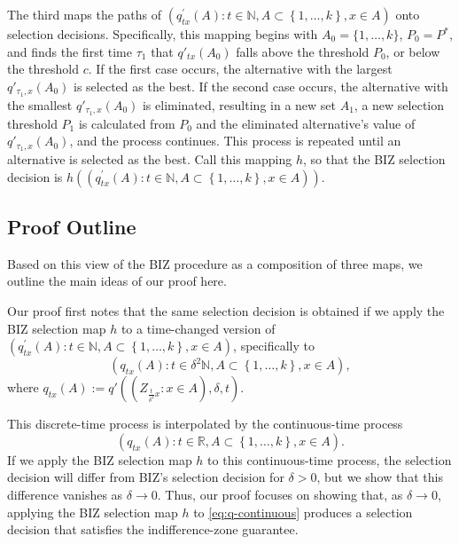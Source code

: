 \documentclass{wscpaperproc}
\theoremstyle{wsc}
\providecommand{\DIFaddtex}[1]{{\protect\color{blue}\uwave{#1}}} %
\providecommand{\DIFaddbegin}{} %
\providecommand{\DIFaddend}{} %
\providecommand{\DIFadd}[1]{\texorpdfstring{\DIFaddtex{#1}}{#1}} %
\begin{document}
The third \DIFaddbegin \DIFadd{one }\DIFaddend maps the paths of $\left(q_{tx}^{'}\left(A\right):t\in\mathbb{N},A\subset\left\{ 1,\ldots,k\right\} ,x\in A\right)$
onto selection decisions. Specifically, this mapping begins with $A_0 = \{1,\ldots,k\}$,
$P_0=P^*$, 
and finds the first time $\tau_1$ that $q'_{tx}(A_0)$ falls above the threshold $P_0$,
or below the threshold $c$.
If the first case occurs, the alternative with the largest $q'_{\tau_1,x}(A_0)$ is selected as the best.
If the second case occurs, the alternative with the smallest
$q'_{\tau_1,x}(A_0)$ is eliminated, resulting in a new set $A_1$, a new selection threshold 
$P_1$ is calculated from $P_0$ and the eliminated alternative's value of $q'_{\tau_1,x}(A_0)$, and the process continues.
This process is repeated until an alternative is selected as the best.
Call this mapping $h$, so that the BIZ selection decision is
$h\left(\left(q_{tx}^{'}\left(A\right):t\in\mathbb{N},A\subset\left\{ 1,\ldots,k\right\} ,x\in A\right)\right)$.

\subsection{Proof Outline}
Based on this view of the BIZ procedure as a composition of three maps, we outline the main ideas of our proof here. 

Our proof first notes that the same selection decision is obtained if we apply
the BIZ selection map $h$ to a time-changed version of 
$\left(q_{tx}^{'}\left(A\right):t\in\mathbb{N},A\subset\left\{ 1,\ldots,k\right\} ,x\in A\right)$, specifically to 
\begin{equation*}
\left(q_{tx}\left(A\right):t\in\delta^2 \mathbb{N},A\subset\left\{ 1,\ldots,k\right\} ,x\in A\right),
\end{equation*}
where
$q_{tx}\left(A\right) := q'\left(\left(Z_{\frac{t}{\delta^{2}}x}:x\in A\right),\delta,t \right)$.

This discrete-time process is interpolated by the continuous-time process 
\begin{equation}
\left(q_{tx}\left(A\right):t\in\mathbb{R},A\subset\left\{ 1,\ldots,k\right\} ,x\in A\right).
\label{eq:q-continuous}
\end{equation}
If we apply the BIZ selection map $h$ to this continuous-time process, the selection decision will differ from BIZ's selection decision for $\delta>0$, but we show that this difference vanishes as $\delta\to0$.  Thus, our proof focuses on showing that, as $\delta\to0$, applying the BIZ selection map $h$ to \eqref{eq:q-continuous} produces a selection decision that satisfies the indifference-zone guarantee. 
\end{document}
